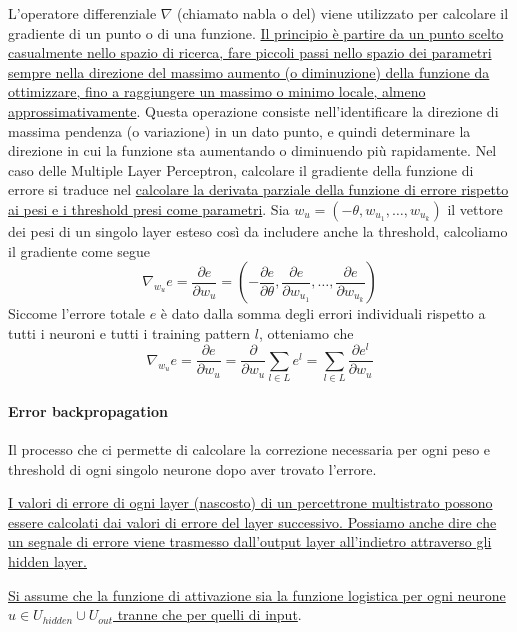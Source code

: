 L'operatore differenziale $\nabla$ (chiamato nabla o del) viene utilizzato per calcolare il gradiente di un punto o di una funzione. \uline{Il principio è partire da un punto scelto casualmente nello spazio di ricerca, fare piccoli passi nello spazio dei parametri sempre nella direzione del massimo aumento (o diminuzione) della funzione da ottimizzare, fino a raggiungere un massimo o minimo locale, almeno approssimativamente}. Questa operazione consiste nell'identificare la direzione di massima pendenza (o variazione) in un dato punto, e quindi determinare la direzione in cui la funzione sta aumentando o diminuendo più rapidamente. Nel caso delle Multiple Layer Perceptron, calcolare il gradiente della funzione di errore si traduce nel \uline{calcolare la derivata parziale della funzione di errore rispetto ai pesi e i threshold presi come parametri}. Sia $w_u = (-\theta,w_{u_1},\dots,w_{u_k})$ il vettore dei pesi di un singolo layer esteso così da includere anche la threshold, calcoliamo il gradiente come segue
$$\nabla_{w_u} e = \frac{\partial e}{\partial w_u} = (-\frac{\partial e}{\partial \theta}, \frac{\partial e}{\partial w_{u_1}},\dots,\frac{\partial e}{\partial w_{u_k}})$$
Siccome l’errore totale $e$ è dato dalla somma degli errori individuali rispetto a
tutti i neuroni e tutti i training pattern $l$, otteniamo che
$$\nabla_{w_u} e = \frac{\partial e}{\partial w_u} = \frac{\partial}{\partial w_u} \sum_{l \in L} e^l = \sum_{l \in L} \frac{\partial e^l}{\partial w_u}$$

\paragraph{Error backpropagation}
Il processo che ci permette di calcolare la correzione necessaria per ogni peso e threshold di ogni singolo neurone dopo aver trovato l’errore. 

\uline{I valori di errore di ogni layer (nascosto) di un percettrone multistrato possono essere calcolati dai valori di errore del layer successivo. Possiamo anche dire che un segnale di errore viene trasmesso dall'output layer all'indietro attraverso gli hidden layer.}

\uline{Si assume che la funzione di attivazione sia la funzione logistica per ogni neurone $u \in U_{hidden} \cup U_{out}$ tranne che per quelli di input}.

